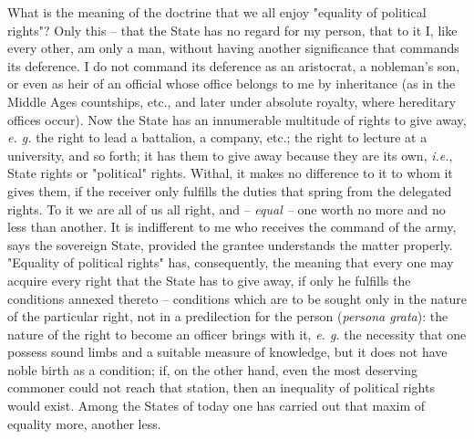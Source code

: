 \documentclass[a4paper]{book}
\begin{document}
What is the meaning of the doctrine that we all enjoy "{}equality of political 
rights"{}? Only this -- that the State has no regard for my person, that to it 
I, like every other, am only a man, without having another significance that 
commands its deference. I do not command its deference as an aristocrat, a 
nobleman's son, or even as heir of an official whose office belongs to me by 
inheritance (as in the Middle Ages countships, etc., and later under absolute 
royalty, where hereditary offices occur). Now the State has an innumerable 
multitude of rights to give away, \textit{e. g.} the right to lead a 
battalion, a company, etc.; the right to lecture at a university, and so 
forth; it has them to give away because they are its own, \textit{i.e.}, State 
rights or "{}political"{} rights. Withal, it makes no difference to it to whom 
it gives them, if the receiver only fulfills the duties that spring from the 
delegated rights. To it we are all of us all right, and -- \textit{equal --} 
one worth no more and no less than another. It is indifferent to me who 
receives the command of the army, says the sovereign State, provided the 
grantee understands the matter properly. "{}Equality of political rights"{} 
has, consequently, the meaning that every one may acquire every right that the 
State has to give away, if only he fulfills the conditions annexed thereto -- 
conditions which are to be sought only in the nature of the particular right, 
not in a predilection for the person (\textit{persona grata}): the nature of 
the right to become an officer brings with it, \textit{e. g.} the necessity 
that one possess sound limbs and a suitable measure of knowledge, but it does 
not have noble birth as a condition; if, on the other hand, even the most 
deserving commoner could not reach that station, then an inequality of 
political rights would exist. Among the States of today one has carried out 
that maxim of equality more, another less.
\end{document}
